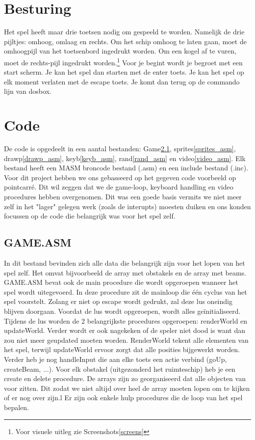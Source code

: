 \documentclass{article}
\begin{document}
\section{Besturing}

Het spel heeft maar drie toetsen nodig om gespeeld te worden. Namelijk de drie pijltjes: omhoog, omlaag en rechts.
Om het schip omhoog te laten gaan, moet de omhoogpijl van het toetsenbord ingedrukt worden.
Om een kogel af te vuren, moet de rechts-pijl ingedrukt worden.\footnote[1]{Voor visuele uitleg zie Screenshots\ref{screens}}
Voor je begint wordt je begroet met een start scherm. Je kan het spel dan starten met de enter toets. 
Je kan het spel op elk moment verlaten met de escape toets. Je komt dan terug op de commando lijn van dosbox.

\section{Code}
De code is opgedeelt in een aantal bestanden: Game\ref{game_asm}, sprites\ref{sprites_asm}, drawp\ref{drawp_asm}, keyb\ref{keyb_asm}, rand\ref{rand_asm} en video\ref{video_asm}. Elk bestand heeft een MASM broncode bestand (.asm) en een include bestand (.inc).
Voor dit project hebben we ons gebasseerd op het gegeven code voorbeeld op pointcarr\'e. Dit wil zeggen dat we de game-loop, keyboard handling en video procedures hebben overgenomen. 
Dit was een goede basis vermits we niet meer zelf in het "lager" gelegen werk (zoals de interupts) moesten duiken en ons konden focussen op de code die belangrijk was voor het spel zelf.

\subsection{GAME.ASM}\label{game_asm}
In dit bestand bevinden zich alle data die belangrijk zijn voor het lopen van het spel zelf. Het omvat bijvoorbeeld de array met obstakels en de array met beams.
GAME.ASM bevat ook de main procedure die wordt opgeroepen wanneer het spel wordt uitegevoerd. In deze procedure zit de mainloop die \'e\'en cyclus van het spel voorstelt.
Zolang er niet op escape wordt gedrukt, zal deze lus oneindig blijven doorgaan. Voordat de lus wordt opgeroepen, wordt alles ge\"initialiseerd. Tijdens de lus worden de 2 belangrijkste procedures opgeroepen: renderWorld en updateWorld. 
Verder wordt er ook nagekeken of de speler niet dood is want dan zou  niet meer geupdated moeten worden.
RenderWorld tekent alle elementen van het spel, terwijl updateWorld ervoor zorgt dat alle posities bijgewerkt worden. Verder heb je nog handleInput die aan elke toets een actie verbind (goUp, createBeam, ...). Voor elk obstakel (uitgezonderd het ruimteschip) heb je een create en delete procedure. De arrays zijn zo georganiseerd dat alle objecten van voor zitten. Dit zodat we niet altijd over heel de array moeten lopen om te kijken of er nog over zijn.l Er zijn ook enkele hulp procedures die de loop van het spel bepalen.
\end{document}
